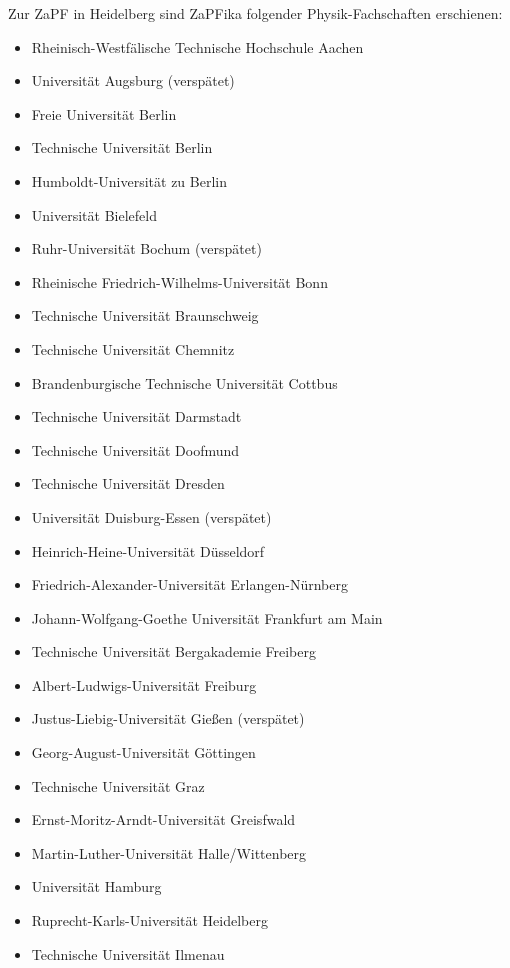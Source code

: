 \label{chap:anwesend}
  Zur ZaPF in Heidelberg sind ZaPFika folgender Physik-Fachschaften erschienen:
  \begin{itemize}
    \item Rheinisch-Westfälische Technische Hochschule Aachen
    \item Universität Augsburg (verspätet)
    \item Freie Universität Berlin
    \item Technische Universität Berlin
    \item Humboldt-Universität zu Berlin
    \item Universität Bielefeld
    \item Ruhr-Universität Bochum (verspätet)
    \item Rheinische Friedrich-Wilhelms-Universität Bonn
    \item Technische Universität Braunschweig
    \item Technische Universität Chemnitz
    \item Brandenburgische Technische Universität Cottbus
    \item Technische Universität Darmstadt
    \item Technische Universität Doofmund
    \item Technische Universität Dresden
    \item Universität Duisburg-Essen (verspätet)
    \item Heinrich-Heine-Universität Düsseldorf
    \item Friedrich-Alexander-Universität Erlangen-Nürnberg
    \item Johann-Wolfgang-Goethe Universität Frankfurt am Main
    \item Technische Universität Bergakademie Freiberg
    \item Albert-Ludwigs-Universität Freiburg
    \item Justus-Liebig-Universität Gießen (verspätet)
    \item Georg-August-Universität Göttingen
    \item Technische Universität Graz
    \item Ernst-Moritz-Arndt-Universität Greisfwald
    \item Martin-Luther-Universität Halle/Wittenberg
    \item Universität Hamburg
    \item Ruprecht-Karls-Universität Heidelberg
    \item Technische Universität Ilmenau

\end{itemize}
